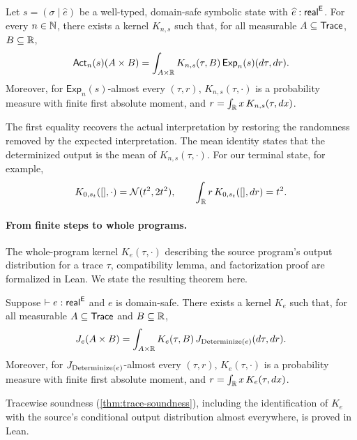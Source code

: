 \begin{theorem}
\label{thm:finite-step-factorization}
Let $s=(\sigma\mid\widehat e)$ be a well-typed,
domain-safe symbolic state with $\widehat e:\mathsf{real}^{\mathsf{E}}$.
For every $n\in\mathbb{N}$, there exists a kernel $K_{n,s}$ such that,
for all measurable $A\subseteq\mathsf{Trace}$, $B\subseteq\mathbb{R}$,
\[
  \mathsf{Act}_n(s)(A\times B)
  =
  \int_{A\times\mathbb{R}}
    K_{n,s}(\tau,B)\,
    \mathsf{Exp}_n(s)(d\tau,dr).
\]
Moreover, for $\mathsf{Exp}_n(s)$-almost every
$(\tau,r)$, $K_{n,s}(\tau,\cdot)$ is a probability
measure with finite first absolute moment, and $r=\int_{\mathbb{R}}x\,K_{n,s}(\tau,dx)$.
\end{theorem}

The first equality recovers the actual
interpretation by restoring the randomness
removed by the expected interpretation.
The mean identity states that the determinized
output is the mean of $K_{n,s}(\tau,\cdot)$.
For our terminal state, for example,
\[
  K_{0,s_t}([],\cdot)=\mathcal N(t^2,2t^2),
  \qquad
  \int_{\mathbb{R}} r\,K_{0,s_t}([],dr)=t^2.
\]

\paragraph{From finite steps to whole programs.}
The whole-program kernel $K_e(\tau,\cdot)$ describing the
source program's output distribution for a trace
$\tau$,
compatibility lemma, and factorization proof
are formalized in Lean. We state the resulting theorem here.

\begin{theorem}
\label{thm:whole-program-factorization}
Suppose $\vdash e:\mathsf{real}^{\mathsf{E}}$ and $e$ is domain-safe.
There exists a kernel $K_e$ such that, for all measurable
$A\subseteq\mathsf{Trace}$ and $B\subseteq\mathbb{R}$,
\[
  J_e(A\times B)
  =
  \int_{A\times\mathbb{R}}
    K_e(\tau,B)\,
    J_{\operatorname{Determinize}(e)}(d\tau,dr).
\]
Moreover, for $J_{\operatorname{Determinize}(e)}$-almost every
$(\tau,r)$, $K_e(\tau,\cdot)$ is a probability
measure with finite first absolute moment, and $r=\int_{\mathbb{R}}x\,K_e(\tau,dx)$.
\end{theorem}

Tracewise soundness (\cref{thm:trace-soundness}), including the
identification of $K_e$ with the source's conditional output distribution
almost everywhere, is proved in Lean.

